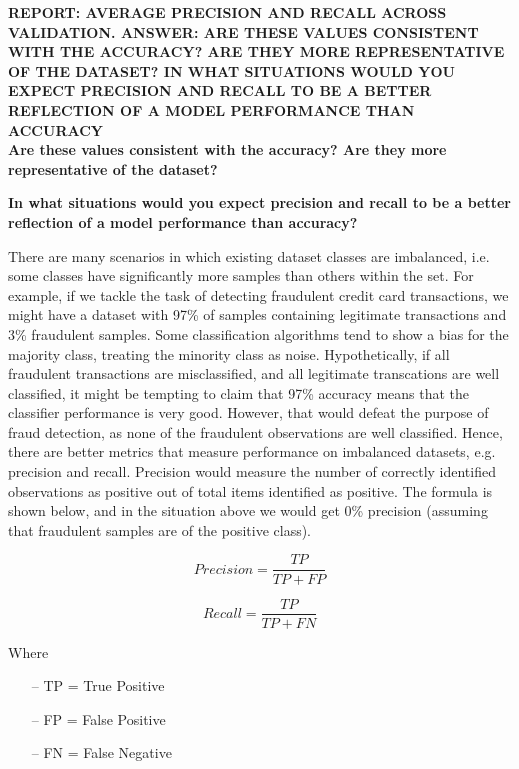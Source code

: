 \documentclass[12pt]{article}
\begin{document}
\textbf{REPORT: AVERAGE PRECISION AND RECALL ACROSS VALIDATION. ANSWER: ARE THESE VALUES CONSISTENT WITH THE ACCURACY? ARE THEY MORE REPRESENTATIVE OF THE DATASET? IN WHAT SITUATIONS WOULD YOU EXPECT PRECISION AND RECALL TO BE A BETTER REFLECTION OF A MODEL PERFORMANCE THAN ACCURACY} \\

\textbf{Are these values consistent with the accuracy? Are they more representative of the dataset?}

\textbf{In what situations would you expect precision and recall to be a better reflection of a model performance than accuracy?}

There are many scenarios in which existing dataset classes are imbalanced, i.e. some classes have significantly more samples than others within the set. For example, if we tackle the task of detecting fraudulent credit card transactions, we might have a dataset with 97\% 
of samples containing legitimate transactions and 3\% fraudulent samples. Some classification algorithms tend to show a bias for the majority class, treating the minority class as noise. Hypothetically, if all fraudulent transactions are misclassified, and all legitimate transcations are well classified, it might be tempting to claim that 97\% accuracy means that the classifier performance is very good. However, that would defeat the purpose of fraud detection, as none of the fraudulent observations are well classified. 
\medskip
\noindent Hence, there are better metrics that measure performance on imbalanced datasets, e.g. precision and recall. Precision would measure the number of correctly identified observations as positive out of total items identified as positive. The formula is shown below, and in the situation above we would get 0\% precision (assuming that fraudulent samples are of the positive class).

\begin{equation}
    Precision = \frac{TP}{TP + FP}
\end{equation}

\begin{equation}
    Recall = \frac{TP}{TP + FN}
\end{equation}

Where 
\begin{itemize}
    \item[--] TP = True Positive
    \item[--] FP = False Positive
    \item[--] FN = False Negative
\end{itemize}
\end{document}
